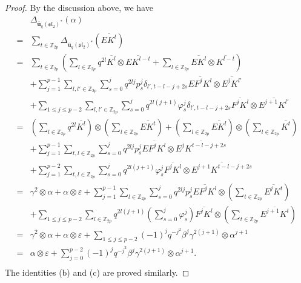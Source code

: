 \documentclass[10pt,oneside]{amsart}
\theoremstyle{definition}
\def\<{\leqslant}
\def\a{\alpha}
\def\b{\beta}
\def\g{\gamma}
\def\ot{\otimes}
\begin{document}
\begin{proof}
 By the discussion above, we have
 $$\begin{array}{rl}
 &\Delta_{\mathbf{\overline{u}}_q(\mathfrak{sl_2})^*}(\a)\\
 =&\sum_{t\in \mathbb{Z}_{2p}}\Delta_{\mathbf{\overline{u}}_q(\mathfrak{sl_2})^*}(\overline{EK^t})\\
 =&\sum_{t\in  \mathbb{Z}_{2p}}(\sum_{l\in  \mathbb{Z}_{2p}}q^{2l}\overline{K^l}\ot \overline{EK^{l-t}}+\sum_{l\in  \mathbb{Z}_{2p}}\overline{EK^l}\ot \overline{K^{l-t}})\\
 &+\sum_{j=1}^{p-1}\sum_{l,l' \in \mathbb{Z}_{2p}}\sum_{s=0}^jq^{2lj}p^j_s\delta_{l',t-l-j+2s}\overline{EF^jK^l}\ot \overline{E^jK^{l'}}\\
 &+\sum_{1\<j\<p-2}\sum_{l,l'\in \mathbb{Z}_{2p}}\sum_{s=0}^jq^{2l(j+1)}\varphi^j_s\delta_{l',t-l-j+2s}\overline{F^jK^l}\ot \overline{E^{j+1}K^{l'}}\\
 =&(\sum_{l\in \mathbb{Z}_{2p}}q^{2l}\overline{K^l})\ot (\sum_{l\in \mathbb{Z}_{2p}}\overline{EK^t})
 +(\sum_{l\in \mathbb{Z}_{2p}}\overline{EK^l})\ot (\sum_{l\in \mathbb{Z}_{2p}}\overline{K^t})\\
 &+\sum_{j=1}^{p-1}\sum_{t,l\in \mathbb{Z}_{2p}}\sum_{s=0}^jq^{2lj}p^{j}_s\overline{EF^jK^l}\ot\overline{E^jK^{t-l-j+2s}}\\
 &+\sum_{j=1}^{p-2}\sum_{t,l\in \mathbb{Z}_{2p}}\sum_{s=0}^jq^{2l(j+1)}\varphi^{j}_s\overline{F^jK^l}\ot\overline{E^{j+1}K^{t-l-j+2s}}\\
 =&\g^2\ot \a+\a\ot \varepsilon +\sum_{j=1}^{p-1}\sum_{l\in \mathbb{Z}_{2p}}\sum_{s=0}^jq^{2lj}p^j_s\overline{EF^jK^l}\ot(\sum_{t\in \mathbb{Z}_{2p}}\overline{E^jK^t})\\
 &+\sum_{1\<j\<p-2}\sum_{l\in \mathbb{Z}_{2p}}q^{2l(j+1)}(\sum_{s=0}^j\varphi^j_s)\overline{F^jK^l}\ot (\sum_{t\in \mathbb{Z}_{2p}}\overline{E^{j+1}K^t})\\
 =&\g^2\ot \a+\a\ot \varepsilon+\sum_{1\<j\<p-2}(-1)^jq^{-j^2}\b^j\g^{2(j+1)}\ot \a^{j+1}\\
 =&\a \ot \varepsilon +\sum_{j=0}^{p-2}(-1)^{j}q^{-j^2}\b^j\g^{2(j+1)}\ot \a^{j+1}.\\
 \end{array}$$
The identities \textup{(b)} and \textup{(c)} are proved similarly.
\end{proof}
\end{document}
